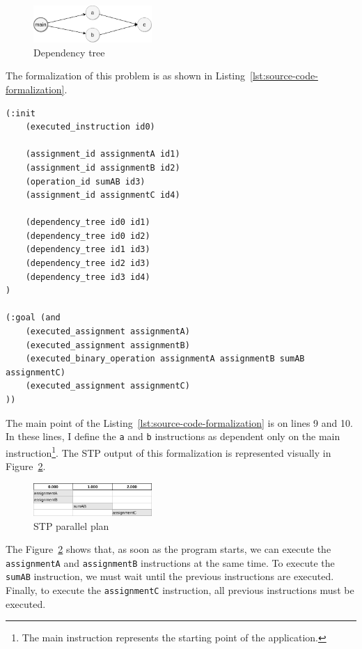 \documentclass[letterpaper]{article}
\begin{document}
\begin{figure}[h]
    \centering
    \includegraphics[width=0.4\textwidth]{./images/dependency-tree-Parallel.png}
    \caption{Dependency tree}
    \label{fig:dependency-tree-parallel}
\end{figure}

The formalization of this problem is as shown in Listing~\ref{lst:source-code-formalization}.

\begin{lstlisting}[caption=Source code formalization,label=lst:source-code-formalization,style=pddlStyle]
(:init
    (executed_instruction id0)

    (assignment_id assignmentA id1)
    (assignment_id assignmentB id2)
    (operation_id sumAB id3)
    (assignment_id assignmentC id4)
    
    (dependency_tree id0 id1)
    (dependency_tree id0 id2)
    (dependency_tree id1 id3)
    (dependency_tree id2 id3)
    (dependency_tree id3 id4)
)

(:goal (and
    (executed_assignment assignmentA)
    (executed_assignment assignmentB)
    (executed_binary_operation assignmentA assignmentB sumAB assignmentC)
    (executed_assignment assignmentC)
))
\end{lstlisting}

The main point of the Listing~\ref{lst:source-code-formalization} is on lines 9 and 10. In these lines, I define the \texttt{a} and \texttt{b} instructions as dependent only on the main instruction\footnote{The main instruction represents the starting point of the application.}. The STP output of this formalization is represented visually in Figure~\ref{fig:parallel-plan}.

\begin{figure}[h]
    \centering
    \includegraphics[width=0.4\textwidth]{./images/parallel-tasks-Parallel.png}
    \caption{STP parallel plan}
    \label{fig:parallel-plan}
\end{figure}

The Figure~\ref{fig:parallel-plan} shows that, as soon as the program starts, we can execute the \texttt{assignmentA} and \texttt{assignmentB} instructions at the same time. To execute the \texttt{sumAB} instruction, we must wait until the previous instructions are executed. Finally, to execute the \texttt{assignmentC} instruction, all previous instructions must be executed.
\end{document}
